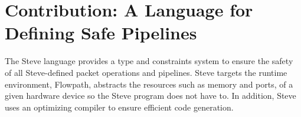 %
%
%
%
%

\section{Contribution: A Language for Defining Safe Pipelines}

The Steve language provides a type and constraints system to ensure the safety
of all Steve-defined packet operations and pipelines.
Steve targets the runtime environment, Flowpath, abstracts the resources
such as memory and ports, of a given hardware device so the Steve program does not
have to.
In addition, Steve uses an optimizing compiler to ensure efficient code generation.

